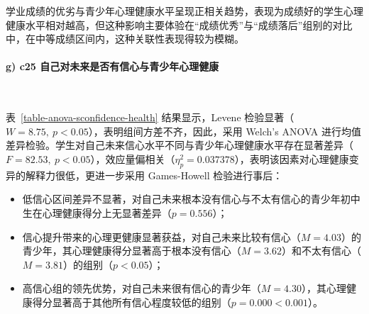 \documentclass[zihao = -4, linespread = 1.5]{article}
\begin{document}
学业成绩的优劣与青少年心理健康水平呈现正相关趋势，表现为成绩好的学生心理健康水平相对越高，但这种影响主要体验在“成绩优秀”与“成绩落后”组别的对比中，在中等成绩区间内，这种关联性表现得较为模糊。

\paragraph*{g) c25 自己对未来是否有信心与青少年心理健康}~{}

表~\ref{table-anova-sconfidence-health} 结果显示，Levene 检验显著（$W=8.75,\ p<0.05$），表明组间方差不齐，因此，采用 Welch's ANOVA 进行均值差异检验。学生对自己未来信心水平不同与青少年心理健康水平存在显著差异（$F=82.53,\ p<0.05$），效应量偏相关（$\eta^2_p=0.037378$），表明该因素对心理健康变异的解释力很低，更进一步采用 Games-Howell 检验进行事后：

\begin{itemize}
    \item 低信心区间差异不显著，对自己未来根本没有信心与不太有信心的青少年初中生在心理健康得分上无显著差异（$p=0.556$）；
    \item 信心提升带来的心理更健康显著获益，对自己未来比较有信心（$M=4.03$）的青少年，其心理健康得分显著高于根本没有信心（$M=3.62$）和不太有信心（$M=3.81$）的组别（$p<0.05$）；
    \item 高信心组的领先优势，对自己未来很有信心的青少年（$M=4.30$），其心理健康得分显著高于其他所有信心程度较低的组别（$p=0.000<0.001$）。
\end{itemize}
\end{document}

